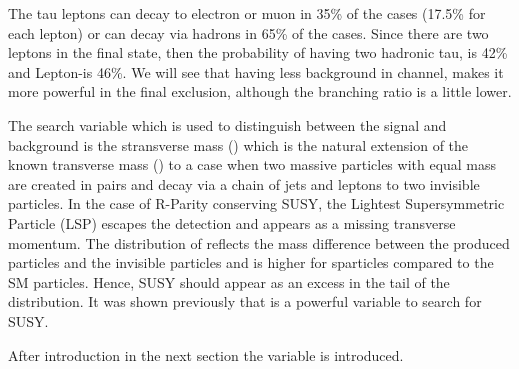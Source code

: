 The tau leptons can decay to electron or muon in 35\% of the cases (17.5\% for each lepton) 
or can decay via hadrons in 65\% of the cases. Since there are two leptons in the final state, then the probability of having 
two hadronic tau, \tauTau is 42\% and Lepton-\Tau is 46\%. We will see that having less background in \tauTau channel, makes it more powerful
in the final exclusion, although the branching ratio is a little lower.

The search variable which is used to distinguish between the signal and background is the stransverse mass (\mttwo) 
which is the natural extension of the known transverse mass (\mt) to a case 
when two massive particles with equal mass are created in pairs and decay via a chain of jets and leptons to two 
invisible particles. 
In the case of R-Parity conserving SUSY, the Lightest Supersymmetric Particle (LSP) escapes the detection and appears as 
a missing transverse momentum.
The distribution of \mttwo reflects the mass difference between the produced particles and the invisible  particles and is higher for sparticles
compared to the SM particles. Hence, SUSY should appear as an excess in the tail of the \mttwo distribution.
It was shown previously \cite{Chatrchyan:2012jx} that \mttwo is a powerful variable to search for SUSY. 




After introduction in the next section the \mttwo variable is introduced. 




